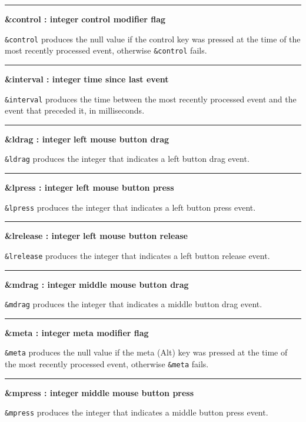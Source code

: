 \bigskip\hrule\vspace{0.1cm}
\noindent
{\bf \&control : integer } \hfill {\bf control modifier flag}

\noindent
\texttt{\&control} produces the null value if the control key was
pressed at the time of the most recently processed event, otherwise
\texttt{\&control} fails.

\bigskip\hrule\vspace{0.1cm}
\noindent
{\bf \&interval : integer } \hfill {\bf time since last event}

\noindent
\texttt{\&interval} produces the time between the most recently
processed event and the event that preceded it, in milliseconds.

\bigskip\hrule\vspace{0.1cm}
\noindent
{\bf \&ldrag : integer } \hfill {\bf left mouse button drag}

\noindent
\texttt{\&ldrag} produces the integer that indicates a left button drag
event.

\bigskip\hrule\vspace{0.1cm}
\noindent
{\bf \&lpress : integer } \hfill {\bf left mouse button press}

\noindent
\texttt{\&lpress} produces the integer that indicates a left button
press event.

\bigskip\hrule\vspace{0.1cm}
\noindent
{\bf \&lrelease : integer } \hfill {\bf left mouse button release}

\noindent
\texttt{\&lrelease} produces the integer that indicates a left button
release event.

\bigskip\hrule\vspace{0.1cm}
\noindent
{\bf \&mdrag : integer } \hfill {\bf  middle mouse button drag}

\noindent
\texttt{\&mdrag} produces the integer that indicates a middle button drag event.

\bigskip\hrule\vspace{0.1cm}
\noindent
{\bf \&meta : integer } \hfill {\bf meta modifier flag}

\noindent
\texttt{\&meta} produces the null value if the meta (Alt) key was
pressed at the time of the most recently processed event, otherwise
\texttt{\&meta} fails.

\bigskip\hrule\vspace{0.1cm}
\noindent
{\bf \&mpress : integer } \hfill {\bf middle mouse button press}

\noindent
\texttt{\&mpress} produces the integer that indicates a middle button
press event.

